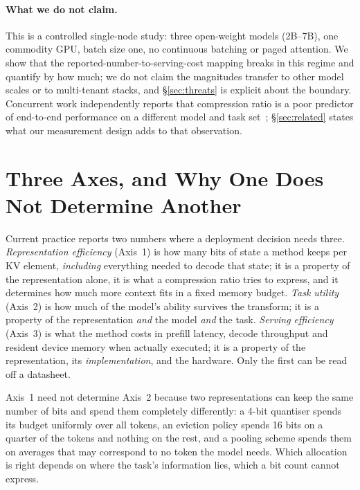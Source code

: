 \documentclass[sigplan,10pt,anonymous,review,nonacm]{acmart}
\begin{document}
\paragraph{What we do not claim.}\label{M-noclaim}
This is a controlled single-node study: three open-weight models (2B--7B), one
commodity GPU, batch size one, no continuous batching or paged attention. We
show that the reported-number-to-serving-cost mapping breaks in this regime
and quantify by how much; we do not claim the magnitudes transfer to other
model scales or to multi-tenant stacks, and \S\ref{sec:threats} is explicit
about the boundary. Concurrent work independently reports that compression
ratio is a poor predictor of end-to-end performance on a different model and
task set~\cite{agrawal2026benchmarking}; \S\ref{sec:related} states what our
measurement design adds to that observation.

\section{Three Axes, and Why One Does Not Determine Another}
\label{sec:axes}

Current practice reports two numbers where a deployment decision needs three.
\emph{Representation efficiency} (Axis~1) is how many bits of state a method
keeps per KV element, \emph{including} everything needed to decode that state;
it is a property of the representation alone, it is what a compression ratio
tries to express, and it determines how much more context fits in a fixed
memory budget. \emph{Task utility} (Axis~2) is how much of the model's ability
survives the transform; it is a property of the representation \emph{and} the
model \emph{and} the task. \emph{Serving efficiency} (Axis~3) is what the
method costs in prefill latency, decode throughput and resident device memory
when actually executed; it is a property of the representation, its
\emph{implementation}, and the hardware. Only the first can be read off a
datasheet.

Axis~1 need not determine Axis~2 because two representations can keep the same
number of bits and spend them completely differently: a 4-bit quantiser spends
its budget uniformly over all tokens, an eviction policy spends 16 bits on a
quarter of the tokens and nothing on the rest, and a pooling scheme spends
them on averages that may correspond to no token the model needs. Which
allocation is right depends on where the task's information lies, which a bit
count cannot express.
\end{document}
